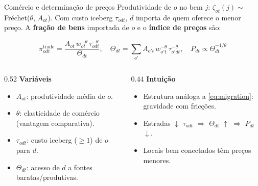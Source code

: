 \begin{frame}{Comércio e determinação de preços}
    Produtividade de $o$ no bem $j$: $\zeta_{ot}(j) \sim$ Fréchet($\theta$, $A_{ot}$). Com custo iceberg $\tau_{odt}$,
    $d$ importa de quem oferece o menor preço. A \textbf{fração de bens} importada de $o$ e o \textbf{índice de preços} são:

    \begin{equation}\label{eq:trade}
        \pi_{odt}^{\text{trade}} = \frac{A_{ot}\,w_{ot}^{-\theta}\,\tau_{odt}^{-\theta}}{\Theta_{dt}},
        \quad
        \Theta_{dt} = \sum_{o'} A_{o't}\,w_{o't}^{-\theta}\,\tau_{o'dt}^{-\theta},
        \quad
        P_{dt} \propto \Theta_{dt}^{-1/\theta}
    \end{equation}

    \vspace{0.1cm}

    \begin{columns}[T]
        \begin{column}{0.52\textwidth}
            \textbf{Variáveis}
            \begin{itemize}\small
                \item $A_{ot}$: produtividade média de $o$.
                \item $\theta$: elasticidade de comércio (vantagem comparativa).
                \item $\tau_{odt}$: custo iceberg ($\geq 1$) de $o$ para $d$.
                \item $\Theta_{dt}$: acesso de $d$ a fontes baratas/produtivas.
            \end{itemize}
        \end{column}
        \begin{column}{0.44\textwidth}
            \textbf{Intuição}
            \begin{itemize}\small
                \item Estrutura análoga a \eqref{eq:migration}: gravidade com fricções.
                \item Estradas $\downarrow$ $\tau_{odt}$ $\Rightarrow$ $\Theta_{dt}$ $\uparrow$ $\Rightarrow$ $P_{dt}$ $\downarrow$.
                \item Locais bem conectados têm preços menores.
            \end{itemize}
        \end{column}
    \end{columns}
\end{frame}

